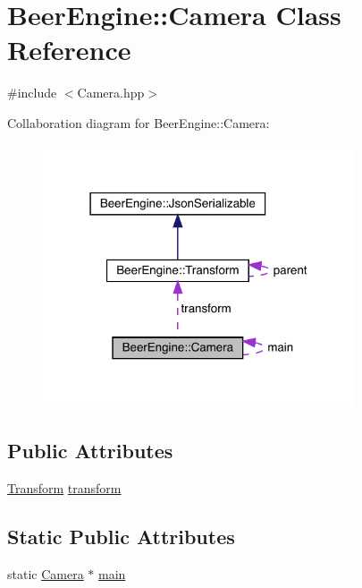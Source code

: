 \hypertarget{class_beer_engine_1_1_camera}{}\section{Beer\+Engine\+:\+:Camera Class Reference}
\label{class_beer_engine_1_1_camera}


{\ttfamily \#include $<$Camera.\+hpp$>$}



Collaboration diagram for Beer\+Engine\+:\+:Camera\+:
\nopagebreak
\begin{figure}[H]
\begin{center}
\leavevmode
\includegraphics[width=262pt]{class_beer_engine_1_1_camera__coll__graph}
\end{center}
\end{figure}
\subsection*{Public Attributes}
\begin{DoxyCompactItemize}
\item 
\mbox{\hyperlink{class_beer_engine_1_1_transform}{Transform}} \mbox{\hyperlink{class_beer_engine_1_1_camera_a4bbec6c322e5f260eca34a98d2eaeb93}{transform}}
\end{DoxyCompactItemize}
\subsection*{Static Public Attributes}
\begin{DoxyCompactItemize}
\item 
static \mbox{\hyperlink{class_beer_engine_1_1_camera}{Camera}} $\ast$ \mbox{\hyperlink{class_beer_engine_1_1_camera_aca558a665afcf487dc66e7deb5edba58}{main}}
\end{DoxyCompactItemize}


